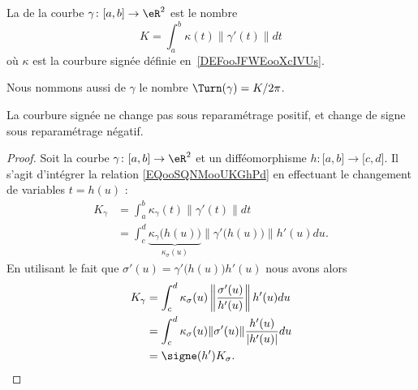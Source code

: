 \begin{definition}\label{DEFooFAENooXWgBmh}
	La  de la courbe \( \gamma\colon \mathopen[ a , b \mathclose] \to \eR^2 \) est le nombre
	\begin{equation}        \label{EQooTIFWooQflOfd}
		K=\int_a^b\kappa(t)\| \gamma'(t) \|dt
	\end{equation}
	où \( \kappa\) est la courbure signée définie en~\ref{DEFooJFWEooXcIVUs}.

	Nous nommons aussi  de \( \gamma\)  le nombre \( \Turn(\gamma)=K/2\pi\).
\end{definition}


\begin{lemma}
	La courbure signée ne change pas sous reparamétrage positif, et change de signe sous reparamétrage négatif.
\end{lemma}

\begin{proof}
	Soit la courbe \( \gamma\colon \mathopen[ a , b \mathclose]\to \eR^2\) et un difféomorphisme \( h\colon \mathopen[ a , b \mathclose]\to \mathopen[ c , d \mathclose]\). Il s'agit d'intégrer la relation \eqref{EQooSQNMooUKGhPd} en effectuant le changement de variables \( t=h(u)\) :
	\begin{subequations}
		\begin{align}
			K_{\gamma} & =\int_a^b\kappa_{\gamma}(t)\| \gamma'(t) \|dt                                                                   \\
			           & =\int_c^d\underbrace{\kappa_{\gamma}\big( h(u) \big)}_{\kappa_{\sigma}(u)}\| \gamma'\big( h(u) \big) \|h'(u)du.
		\end{align}
	\end{subequations}
	En utilisant le fait que \( \sigma'(u)=\gamma'\big( h(u) \big)h'(u)  \) nous avons alors
	\begin{subequations}
		\begin{align}
			K_{\gamma} & =\int_{c}^d\kappa_{\sigma}(u)\left\| \frac{ \sigma'(u) }{ h'(u) }   \right\|h'(u)du \\
			           & =\int_c^d\kappa_{\sigma}(u)\| \sigma'(u) \|\frac{ h'(u) }{ | h'(u) | }du            \\
			           & =\signe(h')K_{\sigma}.
		\end{align}
	\end{subequations}
\end{proof}

